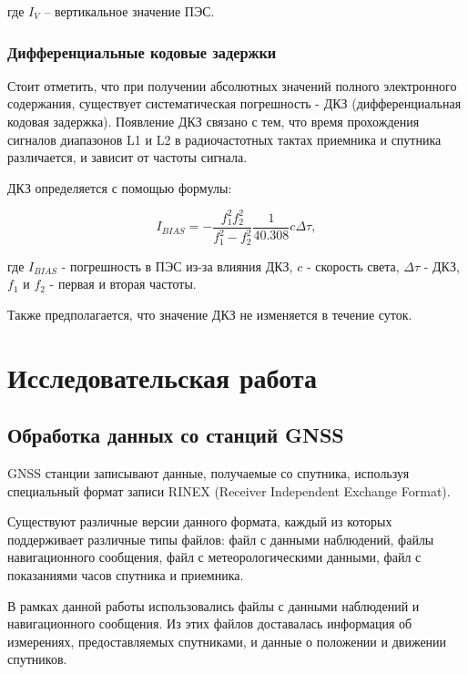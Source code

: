 \documentclass[a4paper]{article}
\begin{document}
где $I_V$ -- вертикальное значение ПЭС. 

\subsubsection{Дифференциальные кодовые задержки}
Стоит отметить, что при получении абсолютных значений полного электронного содержания, существует систематическая погрешность - ДКЗ (дифференциальная кодовая задержка). Появление ДКЗ связано с тем, что время прохождения сигналов диапазонов L1 и L2 в радиочастотных тактах приемника и спутника различается, и зависит от частоты сигнала.

ДКЗ определяется с помощью формулы:

\begin{equation}
I_{BIAS} = -\frac{f_1^2 f_2^2}{f_1^2 - f_2^2} \frac{1}{40.308} c\Delta \tau,
\end{equation}

где $I_{BIAS}$ - погрешность в ПЭС из-за влияния ДКЗ, $c$ - скорость света, $\Delta\tau$ - ДКЗ, $f_1$ и $f_2$ - первая и вторая частоты.

Также предполагается, что значение ДКЗ не изменяется в течение суток.


\newpage
\section{Исследовательская работа}
\subsection{Обработка данных со станций GNSS}
 GNSS станции записывают данные, получаемые со спутника, используя специальный формат записи RINEX (Receiver Independent Exchange Format).
 
 Существуют различные версии данного формата, каждый из которых поддерживает различные типы файлов: файл с данными наблюдений, файлы навигационного сообщения, файл с метеорологическими данными, файл с показаниями часов спутника и приемника.
 
 В рамках данной работы использовались файлы с данными наблюдений и навигационного сообщения. Из этих файлов доставалась информация об измерениях, предоставляемых спутниками, и данные о положении и движении спутников.
  
\end{document}
